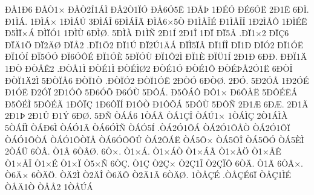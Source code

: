 {^^d0^^c51^^d06
^^d0^^c5^^d21^^d7
^^d0^^c5^^d22^^cd1^^c1^^cc
^^d0^^c52^^d21^^cf^^d3
^^d0^^c56^^d35^^cb
1^^d0^^c5^^de
1^^d0^^c9^^d3
^^d0^^c96^^d3^^cb
2^^d01^^cb
6^^d0^^cc.
^^d01^^cc^^c1.
1^^d0^^cc^^c1^^d7
1^^d0^^cc^^c1^^da
3^^d0^^cc^^c1^^ce
6^^d0^^cc^^c1^^ce^^c4
^^d0^^cc^^c56^^d75^^d2
^^d01^^cc^^c5^^ce^^c9
^^d01^^cc^^c5^^ce^^ce
1^^d02^^cc^^c5^^d4
1^^d0^^cc^^c9^^cb
^^d05^^cc^^cf^^d7^^c1
^^d0^^cc^^cf^^d31
1^^d0^^cc^^d9
6^^d0^^cc^^d8.
5^^d0^^cc^^c0
^^d01^^cc^^d1
2^^d01^^cd
2^^d01^^ce
1^^d0^^cf
^^d0^^cf5^^c2
.^^d0^^cf1^^d72
^^d0^^cf^^c76
^^d0^^cf^^c41^^d6
^^d0^^cf2^^c4^^d8
^^d0^^cf^^c52
.^^d0^^cf1^^d62
^^d0^^cf1^^da
^^d0^^cf2^^da1^^c4^^c1
^^d0^^cf^^cc5^^cf^^c2
^^d0^^cf1^^cd^^ce
^^d0^^cf1^^d0
^^d0^^cf^^d32
^^d0^^cf1^^d3^^cb
^^d0^^cf1^^d3^^cd
^^d0^^cf5^^d3^^d3
^^d0^^cf6^^d3^^d4^^c9
^^d0^^cf1^^d3^^c8
5^^d0^^cf^^d3^^d9
^^d0^^cf1^^d42^^cc
^^d0^^cf1^^c8
^^d0^^cf^^dc1^^cd
2^^d01^^d0
6^^d0^^d0.
^^d0^^d0^^cf1^^c4
1^^d0^^d2
^^d0^^d2^^c5^^ca2
.^^d0^^d2^^c51^^cc
^^d0^^d2^^c91^^cc
^^d0^^d2^^c9^^cc^^d82
^^d0^^d2^^c91^^d3
^^d0^^d2^^c91^^d4
^^d0^^d2^^c9^^de^^c52^^d31^^cb
6^^d0^^d2^^ce
^^d0^^d2^^cf1^^c42^^cc
5^^d0^^d2^^cf^^c56
^^d0^^d2^^cf1^^d2
.^^d0^^d2^^cf^^d32
^^d0^^d2^^cf1^^d3^^cb
2^^d0^^d2^^d3
6^^d0^^d2^^d8.
2^^d0^^d3.
5^^d02^^d3^^c5
1^^d02^^d3^^c9
^^d01^^d3^^cb
^^d02^^d3^^cf
2^^d01^^d3^^d4
5^^d06^^d3^^d5
^^d06^^d3^^d9
5^^d0^^d4^^c1.
^^d05^^d4^^c1^^d4
^^d0^^d41^^d7
^^d06^^d4^^c5^^cb
5^^d0^^d4^^c9^^cb^^c1
^^d05^^d4^^c9^^cc
5^^d0^^d4^^c9^^c3
1^^d0^^d4^^cf^^c7
1^^d06^^d4^^cf^^cd
^^d01^^d4^^d2
^^d01^^d4^^d5^^c1
5^^d0^^d4^^d9
5^^d0^^d4^^d1
2^^d01^^c6
6^^d0^^c6.
2^^d01^^c3
2^^d01^^de
2^^d01^^db
^^d01^^dd
6^^d0^^d8.
5^^d0^^d1
^^d2^^c1^^c16
1^^d2^^c1^^c2
^^d2^^c11^^c7^^ce
^^d2^^c1^^da1^^d7
1^^d2^^c1^^cc^^c7
2^^d21^^c1^^cc^^c0
5^^d2^^c1^^cd^^cc
^^d2^^c1^^d06^^cc
^^d2^^c1^^d31^^c2
^^d2^^c16^^d3^^cc^^d1
^^d2^^c1^^d35^^cd
.^^d2^^c12^^d31^^d4^^c1
^^d2^^c12^^d31^^d4^^c5^^d2
^^d2^^c12^^d31^^d4^^cf
^^d2^^c1^^d31^^d4^^d2^^c1
^^d2^^c1^^d31^^d4^^d2^^cf^^c5
^^d2^^c16^^d3^^d4^^d5^^db
^^d2^^c12^^d4^^c1^^cb
^^d2^^c15^^d4^^d7
^^d2^^c15^^d5^^ce
^^d2^^c15^^d5^^d3
^^d2^^c15^^c8^^cc
2^^d2^^c1^^dc
6^^d2^^c2.
^^d21^^c2
6^^d2^^c2^^d8.
6^^d2^^d7.
^^d21^^d7^^c1.
^^d21^^d7^^c1^^d2
^^d21^^d7^^c1^^c3
^^d21^^d7^^c5^^d6
^^d21^^d7^^c5^^ca
^^d21^^d7^^c5^^ce
^^d21^^d7^^c9
^^d21^^d7^^cf
^^d25^^d7^^d1
6^^d2^^c7.
^^d21^^c7
^^d22^^c7^^d7
^^d22^^c71^^ce
^^d22^^c7^^cf^^d4
6^^d2^^c4.
^^d21^^c4
6^^d2^^c4^^d7.
^^d26^^c4^^d7
6^^d2^^c4^^d6.
^^d2^^c42^^cc
^^d22^^c4^^ce
^^d26^^c4^^d4
^^d22^^c41^^c3
6^^d2^^c4^^d8.
1^^d2^^c5^^c7^^c9
.^^d2^^c5^^c7^^c96^^cf
^^d2^^c5^^c71^^cc^^c9
^^d2^^c5^^c41^^d2
^^d2^^c5^^c52
1^^d2^^c5^^da^^c1
}
